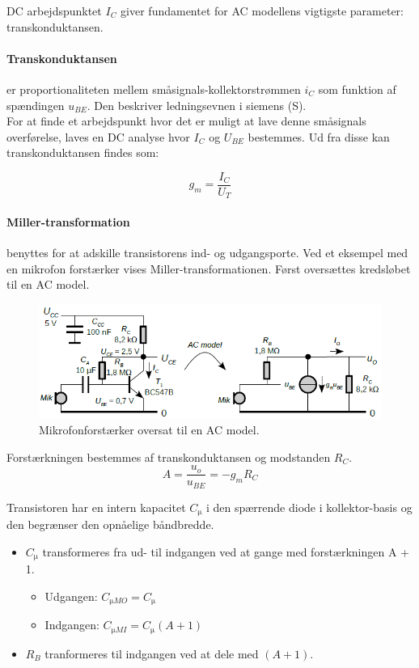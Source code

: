 \documentclass[danish]{article}
\begin{document}
DC arbejdspunktet $I_C$ giver fundamentet for AC modellens vigtigste parameter: transkonduktansen.

\paragraph{Transkonduktansen} er proportionaliteten mellem småsignals-kollektorstrømmen $i_C$ som funktion af spændingen $u_{BE}$. 
Den beskriver ledningsevnen i siemens (S).\\

For at finde et arbejdspunkt hvor det er muligt at lave denne småsignals overførelse, laves en DC analyse hvor $I_C$  og $U_{BE}$ bestemmes. Ud fra disse kan transkonduktansen findes som:

\begin{equation} 
g_m = \dfrac{I_C}{U_T}
\end{equation}

\newpage
\paragraph{Miller-transformation} benyttes for at adskille transistorens ind- og udgangsporte. Ved et eksempel med en mikrofon forstærker vises Miller-transformationen. Først oversættes kredsløbet til en AC model.
\begin{figure} [H]
	\centering
	\includegraphics[width=0.8\linewidth]{graphics/mikrofon}
	\caption{Mikrofonforstærker oversat til en AC model.}
	\label{fig:mikrofonforstarker}
\end{figure}

Forstærkningen bestemmes af transkonduktansen og modstanden $R_C$.
\begin{equation} 
A = \dfrac{u_o}{u_{BE}} = -g_m R_C
\end{equation}

Transistoren har en intern kapacitet $C_{\si{\micro}}$ i den spærrende diode i kollektor-basis og den begrænser den opnåelige båndbredde.

\begin{itemize}
	\item $C_{\si{\micro}}$ transformeres fra ud- til indgangen ved at gange med forstærkningen A + 1.
	\begin{itemize}
		\item Udgangen: $C_{\si{\micro}MO} = C_{\si{\micro}}$
		\item Indgangen: $C_{\si{\micro}MI} = C_{\si{\micro}}(A + 1)$
	\end{itemize}
	\item $R_B$ tranformeres til indgangen ved at dele med $(A + 1)$.
\end{itemize}
\end{document}
